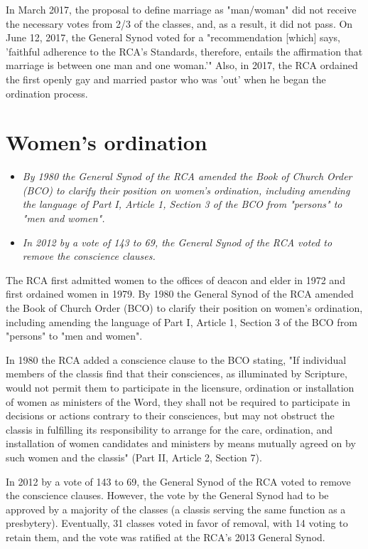 In March 2017, the proposal to define marriage as "man/woman" did not
receive the necessary votes from 2/3 of the classes, and, as a result,
it did not pass. On June 12, 2017, the General Synod voted for a
"recommendation {[}which{]} says, 'faithful adherence to the RCA's
Standards, therefore, entails the affirmation that marriage is between
one man and one woman.'" Also, in 2017, the RCA ordained the first
openly gay and married pastor who was 'out' when he began the ordination
process.

\section{Women's ordination}\label{womens-ordination}

\begin{itemize}
\item
  \emph{By 1980 the General Synod of the RCA amended the Book of Church
  Order (BCO) to clarify their position on women's ordination, including
  amending the language of Part I, Article 1, Section 3 of the BCO from
  "persons" to "men and women".}
\item
  \emph{In 2012 by a vote of 143 to 69, the General Synod of the RCA
  voted to remove the conscience clauses.}
\end{itemize}

The RCA first admitted women to the offices of deacon and elder in 1972
and first ordained women in 1979. By 1980 the General Synod of the RCA
amended the Book of Church Order (BCO) to clarify their position on
women's ordination, including amending the language of Part I, Article
1, Section 3 of the BCO from "persons" to "men and women".

In 1980 the RCA added a conscience clause to the BCO stating, "If
individual members of the classis find that their consciences, as
illuminated by Scripture, would not permit them to participate in the
licensure, ordination or installation of women as ministers of the Word,
they shall not be required to participate in decisions or actions
contrary to their consciences, but may not obstruct the classis in
fulfilling its responsibility to arrange for the care, ordination, and
installation of women candidates and ministers by means mutually agreed
on by such women and the classis" (Part II, Article 2, Section 7).

In 2012 by a vote of 143 to 69, the General Synod of the RCA voted to
remove the conscience clauses. However, the vote by the General Synod
had to be approved by a majority of the classes (a classis serving the
same function as a presbytery). Eventually, 31 classes voted in favor of
removal, with 14 voting to retain them, and the vote was ratified at the
RCA's 2013 General Synod.

